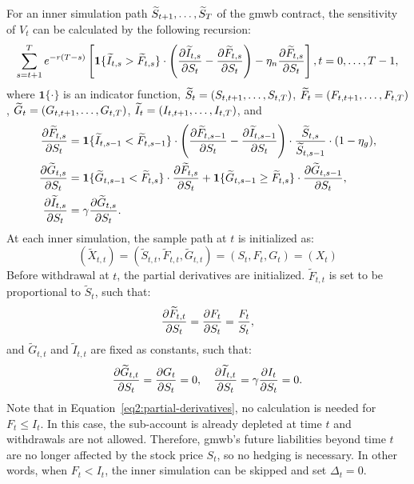 For an inner simulation path $\widetilde{S}_{t+1},\ldots,\widetilde{S}_{T}$ of the \gls{gmwb} contract, the sensitivity of $V_t$ can be calculated by the following recursion:
\begin{equation}
    \sum_{s=t+1}^{T} e^{-r(T-s)} \left[\bm{1}\{\widetilde{I}_{t,s} > \widetilde{F}_{t,s}\} \cdot \left( \frac{\partial \widetilde{I}_{t,s}}{ \partial S_t} - \frac{\partial \widetilde{F}_{t,s}}{ \partial S_t}\right)- \eta_n \frac{\partial \widetilde{F}_{t,s}}{ \partial S_t}\right], \nonumber \\
    t=0,\ldots,T-1, 
\end{equation}
where $\bm{1}\{\cdot\}$ is an indicator function, $\widetilde{S}_t = (S_{t, t+1},\ldots,S_{t, T})$, $\widetilde{F}_t = (F_{t, t+1},\ldots,F_{t, T})$, $\widetilde{G}_t = (G_{t, t+1},\ldots,G_{t, T})$, $\widetilde{I}_t = (I_{t, t+1},\ldots,I_{t, T})$, and
\begin{align} \label{eq2:partial-derivatives}
    \frac{\partial \widetilde{F}_{t, s}}{ \partial S_t} &= \bm{1}\{\widetilde{I}_{t, s-1} < \widetilde{F}_{t, s-1}\}\cdot\left( \frac{\partial \widetilde{F}_{t, s-1}}{ \partial S_t} - \frac{\partial \widetilde{I}_{t, s-1}}{ \partial S_t}\right) \cdot \frac{\widetilde{S}_{t, s}}{\widetilde{S}_{t, s-1}}\cdot (1-\eta_g),\nonumber \\
    \frac{\partial \widetilde{G}_{t, s}}{ \partial S_t} &= \bm{1}\{\widetilde{G}_{t, s-1} < \widetilde{F}_{t, s}\}\cdot\frac{\partial \widetilde{F}_{t, s}}{ \partial S_t} + \bm{1}\{\widetilde{G}_{t, s-1} \geq \widetilde{F}_{t, s}\}\cdot\frac{\partial \widetilde{G}_{t, s-1}}{ \partial S_t},\nonumber \\
    \frac{\partial \widetilde{I}_{t, s}}{ \partial S_t} &= \gamma \frac{\partial \widetilde{G}_{t, s}}{ \partial S_t}.
\end{align}
At each inner simulation, the sample path at $t$ is initialized as:
\begin{equation}
    (\tilde{X}_{t, t}) = (\tilde{S}_{t, t}, \tilde{F}_{t, t}, \tilde{G}_{t, t}) = (S_t, F_t, G_t) = (X_t)
\end{equation}
Before withdrawal at $t$, the partial derivatives are initialized. $\tilde{F}_{t, t}$ is set to be proportional to $\tilde{S}_{t}$, such that:
\begin{equation}
    \frac{\partial \widetilde{F}_{t, t}}{ \partial S_t} = \frac{\partial F_t}{ \partial S_t} = \frac{F_t}{S_t},
\end{equation}
and $\tilde{G}_{t, t}$ and $\tilde{I}_{t, t}$ are fixed as constants, such that:
\begin{equation}
    \frac{\partial \widetilde{G}_{t, t}}{ \partial S_t} = \frac{\partial G_{t}}{ \partial S_t} = 0, \quad \frac{\partial \widetilde{I}_{t, t}}{ \partial S_t} = \gamma \frac{\partial I_{t}}{ \partial S_t} = 0.
\end{equation}
Note that in Equation~\ref{eq2:partial-derivatives}, no calculation is needed for $F_t \leq I_t$. 
In this case, the sub-account is already depleted at time $t$ and withdrawals are not allowed.
Therefore, \gls{gmwb}'s future liabilities beyond time $t$ are no longer affected by the stock price $S_t$, so no hedging is necessary.
In other words, when $F_t < I_t$, the inner simulation can be skipped and set $\Delta_t = 0$.

